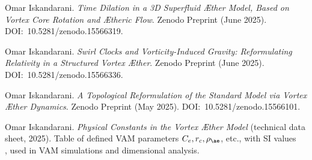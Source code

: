 \documentclass[a4paper, aps,preprint,superscriptaddress, 12pt]{revtex4}
\begin{document}
\begin{thebibliography}{99}


 Omar Iskandarani. \textit{Time Dilation in a 3D Superfluid Æther Model, Based on Vortex Core Rotation and Ætheric Flow}. Zenodo Preprint (June 2025). DOI:~10.5281/zenodo.15566319.


 Omar Iskandarani. \textit{Swirl Clocks and Vorticity-Induced Gravity: Reformulating Relativity in a Structured Vortex Æther}. Zenodo Preprint (June 2025). DOI:~10.5281/zenodo.15566336.


 Omar Iskandarani. \textit{A Topological Reformulation of the Standard Model via Vortex Æther Dynamics}. Zenodo Preprint (May 2025). DOI:~10.5281/zenodo.15566101.


 Omar Iskandarani. \textit{Physical Constants in the Vortex Æther Model} (technical data sheet, 2025). Table of defined VAM parameters $C_e, r_c, \rho_{\ae}$, etc., with SI values~\cite{VAM_constants} ~\cite{VAM_constants} , used in VAM simulations and dimensional analysis.


\end{thebibliography}
\end{document}
